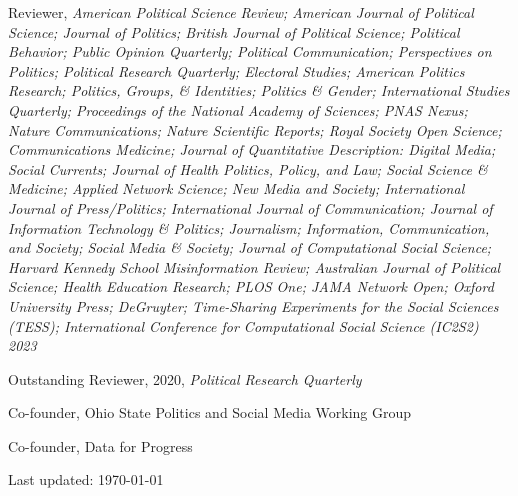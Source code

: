 \documentclass[letterpaper]{article}
\renewenvironment{itemize}{
  \begin{list}{}{
    \setlength{\leftmargin}{1.5em}
  }
}{
  \end{list}
}
\begin{document}
\begin{itemize}
\item Reviewer, \textit{American Political Science Review; American Journal of Political Science; Journal of Politics; British Journal of Political Science; Political Behavior; Public Opinion Quarterly; Political Communication; Perspectives on Politics; Political Research Quarterly; Electoral Studies; American Politics Research; Politics, Groups, \& Identities; Politics \& Gender; International Studies Quarterly; Proceedings of the National Academy of Sciences; PNAS Nexus; Nature Communications; Nature Scientific Reports; Royal Society Open Science; Communications Medicine; Journal of Quantitative Description: Digital Media; Social Currents; Journal of Health Politics, Policy, and Law; Social Science \& Medicine; Applied Network Science; New Media and Society; International Journal of Press/Politics; International Journal of Communication; Journal of Information Technology \& Politics; Journalism; Information, Communication, and Society; Social Media \& Society; Journal of Computational Social Science; Harvard Kennedy School Misinformation Review; Australian Journal of Political Science; Health Education Research; PLOS One; JAMA Network Open; Oxford University Press; DeGruyter; Time-Sharing Experiments for the Social Sciences (TESS); International Conference for Computational Social Science (IC2S2) 2023}
\begin{itemize}
Outstanding Reviewer, 2020, \textit{Political Research Quarterly}
\end{itemize}
\item Co-founder, Ohio State Politics and Social Media Working Group
\item Co-founder, Data for Progress
\end{itemize}

\begin{center}
  \begin{footnotesize}
    Last updated: \today
      \end{footnotesize}
\end{center}
\end{document}
